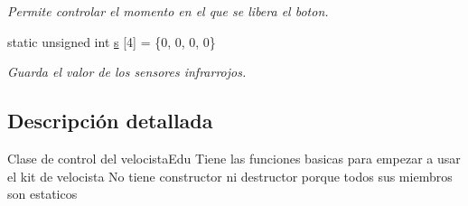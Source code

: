 \begin{DoxyCompactItemize}
\begin{DoxyCompactList}\small\item\em Permite controlar el momento en el que se libera el boton. \end{DoxyCompactList}\item 
\hypertarget{classVelocistaEdu_ae3107ce76e04c78e7294bef7c14c544a}{static unsigned int \hyperlink{classVelocistaEdu_ae3107ce76e04c78e7294bef7c14c544a}{s} \mbox{[}4\mbox{]} = \{0, 0, 0, 0\}}\label{classVelocistaEdu_ae3107ce76e04c78e7294bef7c14c544a}

\begin{DoxyCompactList}\small\item\em Guarda el valor de los sensores infrarrojos. \end{DoxyCompactList}\end{DoxyCompactItemize}


\subsection{Descripción detallada}
Clase de control del velocista\-Edu Tiene las funciones basicas para empezar a usar el kit de velocista No tiene constructor ni destructor porque todos sus miembros son estaticos 

